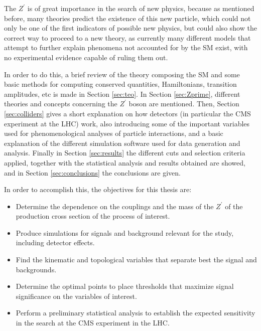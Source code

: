 The $Z^{\prime}$ is of great importance in the search of new physics, because as mentioned before, many theories predict the existence of this new particle, which could not only be one of the first indicators of possible new physics, but could also show the correct way to proceed to a new theory, as currently many different models that attempt to further explain phenomena not accounted for by the SM exist, with no experimental evidence capable of ruling them out.

In order to do this, a brief review of the theory composing the SM and some basic methods for computing conserved quantities, Hamiltonians, transition amplitudes, etc is made in Section \ref{sec:teo}. In Section \ref{sec:Zprime}, different theories and concepts concerning the $Z^{\prime}$ boson are mentioned. Then, Section \ref{sec:colliders} gives a short explanation on how detectors (in particular the CMS experiment at the LHC) work, also introducing some of the important variables used for phenomenological analyses of particle interactions, and a basic explanation of the different simulation software used for data generation and analysis. Finally in Section \ref{sec:results} the different cuts and selection criteria applied, together with the statistical analysis and results obtained are showed, and in Section \ref{sec:conclusions} the conclusions are given.

In order to accomplish this, the objectives for this thesis are:

\begin{itemize}
    \item Determine the dependence on the couplings and the mass of the $Z^{\prime}$ of the production cross section of the process of interest.
    \item Produce simulations for signals and background relevant for the study, including detector effects.
    \item Find the kinematic and topological variables that separate best the signal and backgrounds.
    \item Determine the optimal points to place thresholds that maximize signal significance on the variables of interest.
    \item Perform a preliminary statistical analysis to establish the expected sensitivity in the search at the CMS experiment in the LHC.
\end{itemize}